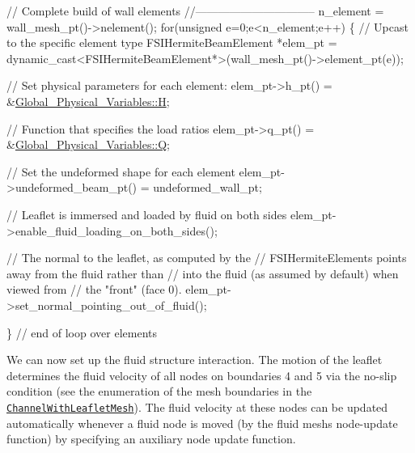\begin{DoxyCodeInclude}
 
 
 \textcolor{comment}{// Complete build of wall elements}
 \textcolor{comment}{//--------------------------------}
 n\_element = wall\_mesh\_pt()->nelement();
 \textcolor{keywordflow}{for}(\textcolor{keywordtype}{unsigned} e=0;e<n\_element;e++)
  \{
   \textcolor{comment}{// Upcast to the specific element type}
   FSIHermiteBeamElement *elem\_pt = 
    \textcolor{keyword}{dynamic\_cast<}FSIHermiteBeamElement*\textcolor{keyword}{>}(wall\_mesh\_pt()->element\_pt(e));
    
   \textcolor{comment}{// Set physical parameters for each element:}
   elem\_pt->h\_pt() = &\hyperlink{namespaceGlobal__Physical__Variables_af6e07423e22c0991084d9a2f43727805}{Global\_Physical\_Variables::H};
    
   \textcolor{comment}{// Function that specifies the load ratios}
   elem\_pt->q\_pt() = &\hyperlink{namespaceGlobal__Physical__Variables_a66cb7ecda9ba0cd72367dd697f154545}{Global\_Physical\_Variables::Q};

   \textcolor{comment}{// Set the undeformed shape for each element}
   elem\_pt->undeformed\_beam\_pt() = undeformed\_wall\_pt;

   \textcolor{comment}{// Leaflet is immersed and loaded by fluid on both sides}
   elem\_pt->enable\_fluid\_loading\_on\_both\_sides();

   \textcolor{comment}{// The normal to the leaflet, as computed by the }
   \textcolor{comment}{// FSIHermiteElements points away from the fluid rather than }
   \textcolor{comment}{// into the fluid (as assumed by default) when viewed from}
   \textcolor{comment}{// the "front" (face 0).}
   elem\_pt->set\_normal\_pointing\_out\_of\_fluid();

  \} \textcolor{comment}{// end of loop over elements}

\end{DoxyCodeInclude}


We can now set up the fluid structure interaction. The motion of the leaflet determines the fluid velocity of all nodes on boundaries 4 and 5 via the no-\/slip condition (see the enumeration of the mesh boundaries in the \href{../../../meshes/mesh_list/html/index.html#channel_with_leaflet}{\tt {\ttfamily Channel\+With\+Leaflet\+Mesh}}). The fluid velocity at these nodes can be updated automatically whenever a fluid node is moved (by the fluid mesh\textquotesingle{}s node-\/update function) by specifying an auxiliary node update function.



